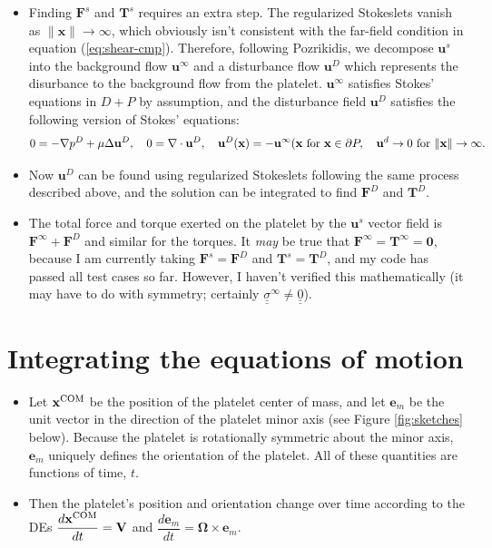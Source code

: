 \documentclass{article}
\newcommand{\tn}{\textnormal}
\newcommand{\vect}[1]{\boldsymbol{\mathbf{#1}}}
\newcommand{\mat}[1]{\underline{\underline{#1}}}
\begin{document}
{\begin{itemize}
  found by solving equation (\ref{eq:quad-sys}), and $\vect{F}_i$ and
  $\vect{T}_i$ are found by evaluating the integrals
  (\ref{eq:force-int}) and (\ref{eq:torque-int}).
\item Finding $\vect{F}^s$ and $\vect{T}^s$ requires an extra
  step. The regularized Stokeslets vanish as $\|\vect{x}\| \rightarrow
  \infty$, which obviously isn't consistent with the far-field
  condition in equation (\ref{eq:shear-cmp}). Therefore, following
  Pozrikidis, we decompose $\vect{u}^s$ into the background flow
  $\vect{u}^\infty$ and a disturbance flow $\vect{u}^D$ which
  represents the disurbance to the background flow from the
  platelet. $\vect{u}^\infty$ satisfies Stokes' equations in $D + P$
  by assumption, and the disturbance field $\vect{u}^D$ satisfies the
  following version of Stokes' equations:
  \begin{equation}
    \label{eq:disturb}
    0 = -\nabla p^D + \mu \Delta \vect{u}^D, \quad 0 = \nabla \cdot
    \vect{u}^D, \quad \vect{u}^D(\vect{x}) = -\vect{u}^\infty(\vect{x}
    \tn{ for } \vect{x} \in \partial P, \quad \vect{u}^d \rightarrow 0
    \tn{ for } \|\mathbf{x}\| \rightarrow \infty.
  \end{equation}
\item Now $\vect{u}^D$ can be found using regularized Stokeslets
  following the same process described above, and the solution can be
  integrated to find $\vect{F}^D$ and $\vect{T}^D$.
\item The total force and torque exerted on the platelet by the
  $\vect{u}^s$ vector field is $\vect{F}^\infty + \vect{F}^D$ and
  similar for the torques. It \emph{may} be true that
  $\vect{F}^\infty = \vect{T}^\infty = \vect{0}$, because I am
  currently taking $\vect{F}^s = \vect{F}^D$ and $\vect{T}^s =
  \vect{T}^D$, and my code has passed all test cases so far. However,
  I haven't verified this mathematically (it may have to do with
  symmetry; certainly $\mat{\sigma}^\infty \neq \mat{0}$).
\end{itemize}
}

\section{Integrating the equations of motion}
\label{sec:integr-equat-moti}

{\color{gray}
\begin{itemize}
\item Let $\vect{x}^\tn{COM}$ be the position of the platelet center
  of mass, and let $\vect{e}_m$ be the unit vector in the direction of
  the platelet minor axis (see Figure \ref{fig:sketches}
  below). Because the platelet is rotationally symmetric about the
  minor axis, $\vect{e}_m$ uniquely defines the orientation of the
  platelet. All of these quantities are functions of time, $t$.
\item Then the platelet's position and orientation change over time
  according to the DEs $\dfrac{d\vect{x}^\tn{COM}}{dt} = \vect{V}$ and
  $\dfrac{d\vect{e}_m}{dt} = \vect{\Omega} \times \vect{e}_m$.
\end{itemize}
}
\end{document}
